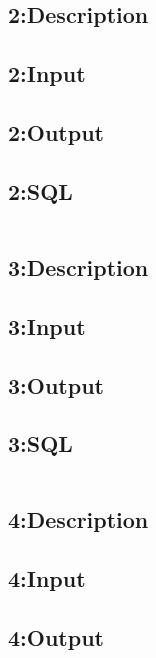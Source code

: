 \documentclass[a4paper, 10pt]{article}
\begin{document}
\subsection{2:Description}

\subsection{2:Input}

\subsection{2:Output}

\subsection{2:SQL}
\begin{lstlisting}[language=SQL]
\end{lstlisting}

\subsection{3:Description}

\subsection{3:Input}

\subsection{3:Output}

\subsection{3:SQL}
\begin{lstlisting}[language=SQL]
\end{lstlisting}

\subsection{4:Description}

\subsection{4:Input}

\subsection{4:Output}
\end{document}
